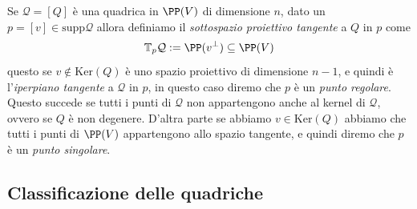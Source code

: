 \documentclass[11pt]{scrartcl}
\renewcommand{\ker}[1]{\text{Ker}\left(#1\right)}
\begin{document}
	\begin{definition}
		Se $\mathcal{Q}=[Q]$ è una quadrica in $\PP(V)$ di dimensione $n$, dato un $p=[v]\in \text{supp}\mathcal{Q}$ allora definiamo il \textit{sottospazio proiettivo tangente} a $Q$ in $p$ come 
		$$\mathbb{T}_p\mathcal{Q}:=\PP(v^\perp)\subseteq \PP(V)$$
		questo se $v\not\in \ker{Q}$ è uno spazio proiettivo di dimensione $n-1$, e quindi è l'\textit{iperpiano tangente} a $\mathcal{Q}$ in $p$, in questo caso diremo che $p$ è un \textit{punto regolare}. Questo succede se tutti i punti di $\mathcal{Q}$ non appartengono anche al kernel di $\mathcal{Q}$, ovvero se $Q$ è non degenere. D'altra parte se abbiamo $v\in \ker{Q}$ abbiamo che tutti i punti di $\PP(V)$ appartengono allo spazio tangente, e quindi diremo che $p$ è un \textit{punto singolare}.
	\end{definition}
	
	\subsection{Classificazione delle quadriche}
	
\end{document}

